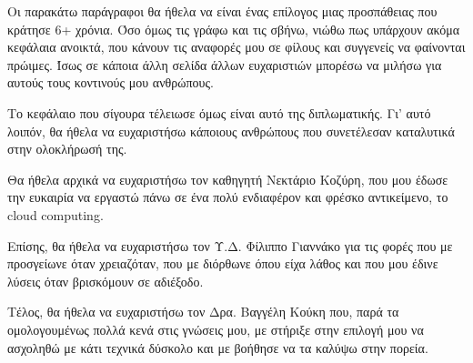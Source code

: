 \begin{acknowledgementsgr}
	Οι παρακάτω παράγραφοι θα ήθελα να είναι ένας επίλογος μιας προσπάθειας που 
	κράτησε 6+ χρόνια. Όσο όμως τις γράφω και τις σβήνω, νιώθω πως υπάρχουν 
	ακόμα κεφάλαια ανοικτά, που κάνουν τις αναφορές μου σε φίλους και συγγενείς 
	να φαίνονται πρώιμες. Ίσως σε κάποια άλλη σελίδα άλλων ευχαριστιών μπορέσω 
	να μιλήσω για αυτούς τους κοντινούς μου ανθρώπους.

	Το κεφάλαιο που σίγουρα τέλειωσε όμως είναι αυτό της διπλωματικής. Γι' αυτό 
	λοιπόν, θα ήθελα να ευχαριστήσω κάποιους ανθρώπους που συνετέλεσαν 
	καταλυτικά στην ολοκλήρωσή της.
	
	Θα ήθελα αρχικά να ευχαριστήσω τον καθηγητή Νεκτάριο Κοζύρη, που μου έδωσε 
	την ευκαιρία να εργαστώ πάνω σε ένα πολύ ενδιαφέρον και φρέσκο αντικείμενο, 
	το cloud computing.

	Επίσης, θα ήθελα να ευχαριστήσω τον Υ.Δ. Φίλιππο Γιαννάκο για τις φορές που 
	με προσγείωνε όταν χρειαζόταν, που με διόρθωνε όπου είχα λάθος και που μου
	έδινε λύσεις όταν βρισκόμουν σε αδιέξοδο.

	Τέλος, θα ήθελα να ευχαριστήσω τον Δρα. Βαγγέλη Κούκη που, παρά τα 
	ομολογουμένως πολλά κενά στις γνώσεις μου, με στήριξε στην επιλογή μου να 
	ασχοληθώ με κάτι τεχνικά δύσκολο και με βοήθησε να τα καλύψω στην πορεία.
\end{acknowledgementsgr}
